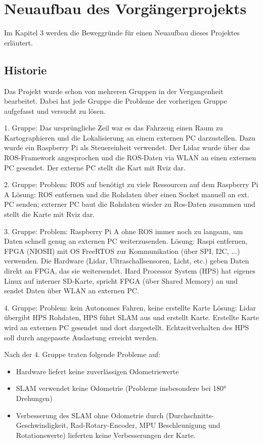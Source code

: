 

\chapter{Neuaufbau des Vorgängerprojekts}

Im Kapitel 3 werden die Beweggründe für einen Neuaufbau dieses Projektes erläutert.

\section{Historie}
Das Projekt wurde schon von mehreren Gruppen in der Vergangenheit bearbeitet. Dabei hat jede Gruppe die Probleme der vorherigen Gruppe aufgefasst und versucht zu lösen. 

1. Gruppe: 
Das ursprüngliche Zeil war es das Fahrzeug einen Raum zu Kartographieren und die Lokalisierung an einem externen PC darzustellen. Dazu wurde ein Raspberry Pi als Steuereinheit verwendet. Der Lidar wurde über das ROS-Framework angesprochen und die ROS-Daten via WLAN an einen externen PC gesendet. Der externe PC stellt die Kart mit Rviz dar.

2. Gruppe:
Problem: ROS auf benötigt zu viele Ressourcen auf dem Raspberry Pi A
Lösung: ROS entfernen und die Rohdaten über einen Socket manuell an ext. PC senden; externer PC baut die Rohdaten wieder zu Ros-Daten zusammen und stellt die Karte mit Rviz dar.

3. Gruppe:
Problem: Raspberry Pi A ohne ROS immer noch zu langsam, um Daten schnell genug an externen PC weiterzusenden.
Lösung: Raspi entfernen, FPGA (NIOSII) mit OS FreeRTOS zur Kommunikation (über SPI, I2C, ...) verwenden. Die Hardware (Lidar, Ultraschallsensoren, Licht, etc.) geben Daten direkt an FPGA, das sie weitersendet. Hard Processor System (HPS) hat eigenes Linux auf interner SD-Karte, spricht FPGA (über Shared Memory) an und sendet Daten über WLAN an externen PC.

4. Gruppe:
Problem: kein Autonomes Fahren, keine erstellte Karte
Lösung: Lidar übergibt HPS Rohdaten, HPS führt SLAM aus und erstellt Karte. Erstellte Karte wird an externen PC gesendet und dort dargestellt. Echtzeitverhalten des HPS soll durch angepasste Auslastung erreicht werden.

Nach der 4. Gruppe traten folgende Probleme auf:
\begin{itemize}
\item  Hardware liefert keine zuverlässigen Odometriewerte
\item  SLAM verwendet keine Odometrie (Probleme insbesondere bei 180° Drehungen)
\item  Verbesserung des SLAM ohne Odometrie durch (Durchschnitts-Geschwindigkeit, Rad-Rotary-Encoder, MPU Beschleunigung und Rotationswerte) lieferten keine Verbesserungen der Karte.
\end{itemize}







